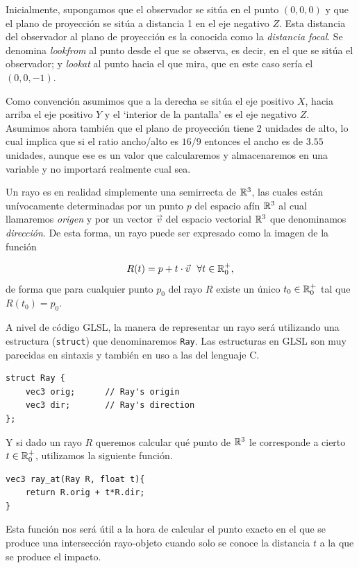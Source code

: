 Inicialmente, supongamos que el observador se sitúa en el punto $(0,0,0)$ y que el plano de proyección se sitúa a distancia 1 en el eje negativo $Z$. Esta distancia del observador al plano de proyección es la conocida como la \textit{distancia focal}. Se denomina \textit{lookfrom} al punto desde el que se observa, es decir, en el que se sitúa el observador; y \textit{lookat} al punto hacia el que mira, que en este caso sería el $(0,0,-1)$. 

Como convención asumimos que a la derecha se sitúa el eje positivo $X$, hacia arriba el eje positivo $Y$ y el `interior de la pantalla' es el eje negativo $Z$. Asumimos ahora también que el plano de proyección tiene 2 unidades de alto, lo cual implica que si el ratio ancho/alto es $16/9$ entonces el ancho es de $3.55$ unidades, aunque ese es un valor que calcularemos y almacenaremos en una variable y no importará realmente cual sea.

Un rayo es en realidad simplemente una semirrecta de $\mathbb{R}^3$, las cuales están unívocamente determinadas por un punto $p$ del espacio afín $\mathbb{R}^3$ al cual llamaremos \textit{origen} y por un vector $\vec v$ del espacio vectorial $\mathbb{R}^3$ que denominamos \textit{dirección}. De esta forma, un rayo puede ser expresado como la imagen de la función

$$
R(t) = p + t\cdot \vec v \ \ \forall t\in\mathbb{R}_0^+,
$$
de forma que para cualquier punto $p_0$ del rayo $R$ existe un único $t_0\in\mathbb{R}_0^+$ tal que $R(t_0) = p_0$.

A nivel de código GLSL, la manera de representar un rayo será utilizando una estructura (\verb|struct|) que denominaremos \verb|Ray|. Las estructuras en GLSL son muy parecidas en sintaxis y también en uso a las del lenguaje C. 

\begin{lstlisting}
struct Ray {
    vec3 orig;      // Ray's origin
    vec3 dir;       // Ray's direction
};
\end{lstlisting}

Y si dado un rayo $R$ queremos calcular qué punto de $\mathbb{R}^3$ le corresponde a cierto $t\in\mathbb{R}_0^+$, utilizamos la siguiente función.

\begin{lstlisting}
vec3 ray_at(Ray R, float t){
    return R.orig + t*R.dir;
}
\end{lstlisting}

Esta función nos será útil a la hora de calcular el punto exacto en el que se produce una intersección rayo-objeto cuando solo se conoce la distancia $t$ a la que se produce el impacto.

